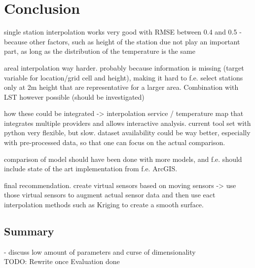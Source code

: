 \chapter{Conclusion}
\label{chap:Conclusion}

single station interpolation works very good with RMSE between 0.4 and 0.5
- because other factors, such as height of the station due not play an important part, as long as the distribution of the temperature is the same

areal interpolation way harder. probably because information is missing (target variable for location/grid cell and height), making it hard to f.e. select stations only at 2m height that are representative for a larger area. Combination with LST however possible (should be investigated)

how these could be integrated -> interpolation service / temperature map that integrates multiple providers and allows interactive analysis. current tool set with python very flexible, but slow. dataset availability could be way better, especially with pre-processed data, so that one can focus on the actual comparison.

comparison of model should have been done with more models, and f.e. should include state of the art implementation from f.e. ArcGIS. 

final recommendation. create virtual sensors based on moving sensors -> use those virtual sensors to augment actual sensor data and then use eact interpolation methods such as Kriging to create a smooth surface.  
\section{Summary}

- discuss low amount of parameters and curse of dimensionality\\

TODO: Rewrite once Evaluation done\\
\\

